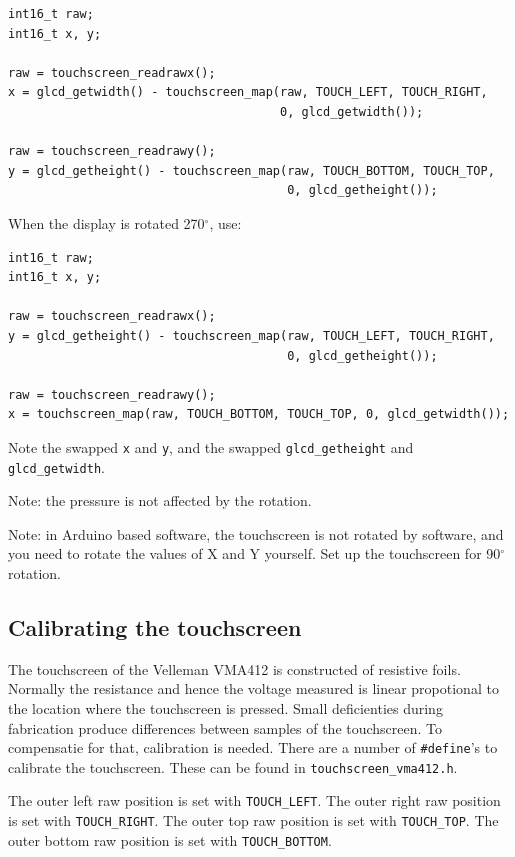 \documentclass[12pt]{article}
\begin{document}
\begin{lstlisting}
int16_t raw;
int16_t x, y;

raw = touchscreen_readrawx();
x = glcd_getwidth() - touchscreen_map(raw, TOUCH_LEFT, TOUCH_RIGHT,
                                      0, glcd_getwidth());

raw = touchscreen_readrawy();
y = glcd_getheight() - touchscreen_map(raw, TOUCH_BOTTOM, TOUCH_TOP,
                                       0, glcd_getheight());
\end{lstlisting}

When the display is rotated 270$^\circ$, use:

\begin{lstlisting}
int16_t raw;
int16_t x, y;

raw = touchscreen_readrawx();
y = glcd_getheight() - touchscreen_map(raw, TOUCH_LEFT, TOUCH_RIGHT,
                                       0, glcd_getheight());

raw = touchscreen_readrawy();
x = touchscreen_map(raw, TOUCH_BOTTOM, TOUCH_TOP, 0, glcd_getwidth());
\end{lstlisting}

Note the swapped \lstinline|x| and \lstinline|y|, and the swapped \lstinline|glcd_getheight| and \lstinline|glcd_getwidth|.

Note: the pressure is not affected by the rotation.

Note: in Arduino based software, the touchscreen is not rotated by software, and you need to rotate the values of X and Y yourself. Set up the touchscreen for 90$^\circ$ rotation.

\subsection{Calibrating the touchscreen}
\label{sec:calibrating}
The touchscreen of the Velleman VMA412 is constructed of resistive foils. Normally the resistance and hence the voltage measured is linear propotional to the location where the touchscreen is pressed. Small deficienties during fabrication produce differences between samples of the touchscreen. To compensatie for that, calibration is needed. There are a number of \lstinline|#define|'s to calibrate the touchscreen. These can be found in \lstinline|touchscreen_vma412.h|.

The outer left raw position is set with \lstinline|TOUCH_LEFT|. The outer right raw position is set with \lstinline|TOUCH_RIGHT|. The outer top raw position is set with \lstinline|TOUCH_TOP|. The outer bottom raw position is set with \lstinline|TOUCH_BOTTOM|.
\end{document}
